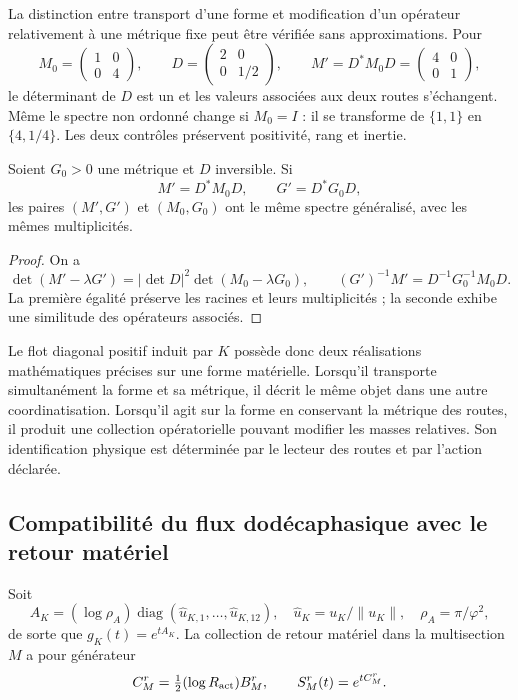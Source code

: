 La distinction entre transport d’une forme et modification d’un
opérateur relativement à une métrique fixe peut être vérifiée sans approximations.
Pour
\[
 M_0=\begin{pmatrix}1&0\\0&4\end{pmatrix},\qquad
 D=\begin{pmatrix}2&0\\0&1/2\end{pmatrix},\qquad
 M'=D^*M_0D=\begin{pmatrix}4&0\\0&1\end{pmatrix},
\]
le déterminant de \(D\) est un et les valeurs associées aux deux
routes s’échangent. Même le spectre non ordonné change si
\(M_0=I\) : il se transforme de \(\{1,1\}\) en \(\{4,1/4\}\).
Les deux contrôles préservent positivité, rang et inertie.

\begin{proposition}
Soient \(G_0>0\) une métrique et \(D\) inversible. Si
\[
 M'=D^*M_0D,\qquad G'=D^*G_0D,
\]
les paires \((M',G')\) et \((M_0,G_0)\) ont le même spectre
généralisé, avec les mêmes multiplicités.
\end{proposition}
\begin{proof}
On a
\[
 \det(M'-\lambda G')=|\det D|^2\det(M_0-\lambda G_0),
 \qquad (G')^{-1}M'=D^{-1}G_0^{-1}M_0D.
\]
La première égalité préserve les racines et leurs multiplicités ; la
seconde exhibe une similitude des opérateurs associés.
\end{proof}

Le flot diagonal positif induit par \(K\) possède donc deux réalisations mathématiques précises sur une forme matérielle. Lorsqu'il transporte simultanément la forme et sa métrique, il décrit le même objet dans une autre coordinatisation. Lorsqu'il agit sur la forme en conservant la métrique des routes, il produit une collection opératorielle pouvant modifier les masses relatives. Son identification physique est déterminée par le lecteur des routes et par l'action déclarée.

\subsection{Compatibilité du flux dodécaphasique avec le retour matériel}

Soit
\[
 A_K=(\log\rho_A)\operatorname{diag}(\widehat u_{K,1},\ldots,
       \widehat u_{K,12}),\quad
 \widehat u_K=u_K/\|u_K\|,\quad \rho_A=\pi/\varphi^2,
\]
de sorte que \(g_K(t)=e^{tA_K}\). La collection de retour matériel dans la multisection \(M\) a pour générateur
\[
 C_M^r=\tfrac12(\log R_{\rm act})B_M^r,\qquad
 S_M^r(t)=e^{tC_M^r}.
\]

